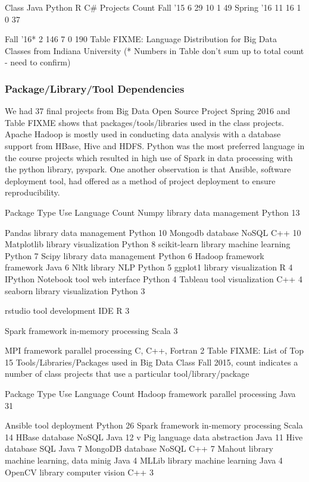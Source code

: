 \documentclass[9pt,twocolumn,twoside]{styles/osajnl}
\begin{document}
Class
	Java
	Python
	R
	C\#
	Projects Count
	Fall ’15
	6
	29
	10
	1
	49
	Spring ’16
	11
	16
	1
	0
	37

	Fall ’16*
	2
	146
	7
	0
	190
	Table  FIXME:  Language Distribution for Big Data Classes from Indiana University
(* Numbers in Table don’t sum up to total count - need to confirm)
\subsubsection{Package/Library/Tool Dependencies}

We had 37 final projects from Big Data Open Source Project Spring 2016
and Table FIXME shows that packages/tools/libraries used in the class
projects. Apache Hadoop is mostly used in conducting data analysis
with a database support from HBase, Hive and HDFS. Python was the most
preferred language in the course projects which resulted in high use
of Spark in data processing with the python library, pyspark. One
another observation is that Ansible, software deployment tool, had
offered as a method of project deployment to ensure reproducibility.





Package
	Type
	Use
	Language
	Count
	Numpy
	library
	data management
	Python
	13

	Pandas
	library
	data management
	Python
	10
	Mongodb
	database
	NoSQL
	C++
	10
	Matplotlib
	library
	visualization
	Python
	8
	scikit-learn
	library
	machine learning
	Python
	7
	Scipy
	library
	data management
	Python
	6
	Hadoop
	framework
	framework
	Java
	6
	Nltk
	library
	NLP
	Python
	5
	ggplot1
	library
	visualization
	R
	4
	IPython Notebook
	tool
	web interface
	Python
	4
	Tableau
	tool
	visualization
	C++
	4
	seaborn
	library
	visualization
	Python
	3

	rstudio
	tool
	development IDE
	R
	3

	Spark
	framework
	in-memory processing
	Scala
	3

	MPI
	framework
	parallel processing
	C, C++, Fortran
	2
	Table FIXME: List of Top 15 Tools/Libraries/Packages used in Big Data Class Fall 2015, count indicates a number of class projects that use a particular tool/library/package


Package
	Type
	Use
	Language
	Count
	Hadoop
	framework
	parallel processing
	Java
	31

	Ansible
	tool
	deployment
	Python
	26
	Spark
	framework
	in-memory processing
	Scala
	14
	HBase
	database
	NoSQL
	Java
	12
v	Pig
	language
	data abstraction
	Java
	11
	Hive
	database
	SQL
	Java
	7
	MongoDB
	database
	NoSQL
	C++
	7
	Mahout
	library
	machine learning, data minig
	Java
	4
	MLLib
	library
	machine learning
	Java
	4
	OpenCV
	library
	computer vision
	C++
	3
\end{document}
